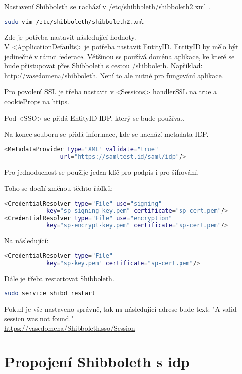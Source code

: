Nastavení Shibboleth se nachází v /etc/shibboleth/shibboleth2.xml .

\begin{lstlisting}[language=Bash]
   sudo vim /etc/shibboleth/shibboleth2.xml
\end{lstlisting}

Zde je potřeba nastavit následující hodnoty. \\V <ApplicationDefaults> je potřeba nastavit EntityID. EntityID by mělo být jedinečné v rámci federace. Většinou se používá doména aplikace, ke které se bude přistupovat přes Shibboleth s cestou /shibboleth. Například: http://vasedomena/shibboleth. Není to ale nutné pro fungování aplikace.

Pro povolení SSL je třeba nastavit v <Sessions>  handlerSSL na true a cookieProps na https.

Pod <SSO> se přidá EntityID IDP, který se bude používat.

Na konec souboru se přidá informace, kde se nachází metadata IDP.
\begin{lstlisting}[language=Bash]
 <MetadataProvider type="XML" validate="true"
                url="https://samltest.id/saml/idp"/>
\end{lstlisting}

Pro jednoduchost se použije jeden klíč pro podpis i pro šifrování.

Toho se docílí změnou těchto řádků:
\begin{lstlisting}[language=Bash]
<CredentialResolver type="File" use="signing"
            key="sp-signing-key.pem" certificate="sp-cert.pem"/>
<CredentialResolver type="File" use="encryption"
            key="sp-encrypt-key.pem" certificate="sp-cert.pem"/>
\end{lstlisting}

Na následující:
\begin{lstlisting}[language=Bash]
<CredentialResolver type="File"
            key="sp-key.pem" certificate="sp-cert.pem"/>
\end{lstlisting}

Dále je třeba restartovat Shibboleth.
\begin{lstlisting}[language=Bash]
sudo service shibd restart
\end{lstlisting}

Pokud je vše nastaveno správně, tak na následující adrese bude text: "A valid session was not found."\\
\url{https://vasedomena/Shibboleth.sso/Session}

\section{Propojení Shibboleth s idp}

